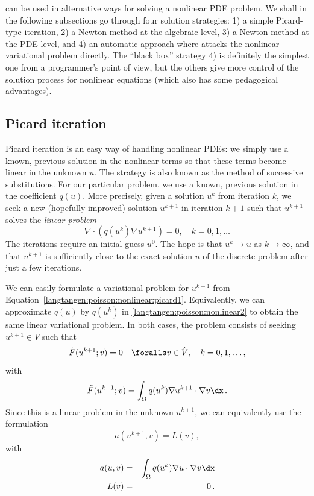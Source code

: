\fenics{} can be used in alternative ways for solving a nonlinear PDE
problem. We shall in the following subsections go through four
solution strategies:
1) a simple Picard-type iteration,
2) a Newton method at the algebraic level,
3) a Newton method at the PDE level, and
4) an automatic approach where \fenics{} attacks the nonlinear variational
problem directly. The ``black box'' strategy 4) is definitely the
simplest one from a
programmer's point of view, but the others give more control of the
solution process for nonlinear equations (which also has some
pedagogical advantages).

\subsection{Picard iteration}
\label{langtangen:nonlinear:Picard}

Picard iteration is an easy way of handling nonlinear PDEs: we simply
use a known, previous solution in the nonlinear terms so that these
terms become linear in the unknown $u$. The strategy is also known as
the method of successive substitutions.
For our particular problem,
we use a known, previous solution in the coefficient $q(u)$.
More precisely, given a solution $u^k$ from iteration $k$, we seek a
new (hopefully improved) solution $u^{k+1}$ in iteration $k+1$ such
that $u^{k+1}$ solves the \emph{linear problem}
\begin{equation}
\label{langtangen:poisson:nonlinear:picard1}
\nabla\cdot \left(q(u^k)\nabla u^{k+1}\right) = 0,\quad k=0,1,\ldots
\end{equation}
The iterations require an initial guess $u^0$.
The hope is that $u^{k} \rightarrow u$ as $k\rightarrow\infty$, and that
$u^{k+1}$ is sufficiently close to the exact
solution $u$ of the discrete problem after just a few iterations.

We can easily formulate a variational problem for $u^{k+1}$ from
Equation~\eqref{langtangen:poisson:nonlinear:picard1}.
Equivalently, we can approximate $q(u)$ by $q(u^k)$ in
\eqref{langtangen:poisson:nonlinear2}
to obtain the same linear variational problem.
In both cases, the problem consists of seeking
$u^{k+1} \in V$ such that
\begin{equation} \label{langtangen:poisson:nonlinear:picard2}
  \tilde F(u^{k+1}; v) = 0 \quad \foralls v \in \hat{V},\quad k=0,1,\ldots,
\end{equation}
with
\begin{equation}
\label{langtangen:poisson:nonlinear:picard3}
\tilde F(u^{k+1}; v) = \int_\Omega q(u^k)\nabla u^{k+1}\cdot \nabla v\dx
\langtangenep
\end{equation}
Since this is a linear problem in the unknown $u^{k+1}$, we can equivalently
use the formulation
\begin{equation}
a(u^{k+1},v) = L(v),
\end{equation}
with
\begin{eqnarray}
a(u,v) &=& \int_\Omega q(u^k)\nabla u\cdot \nabla v\dx
\\
L(v) &=& 0\langtangenep
\end{eqnarray}


